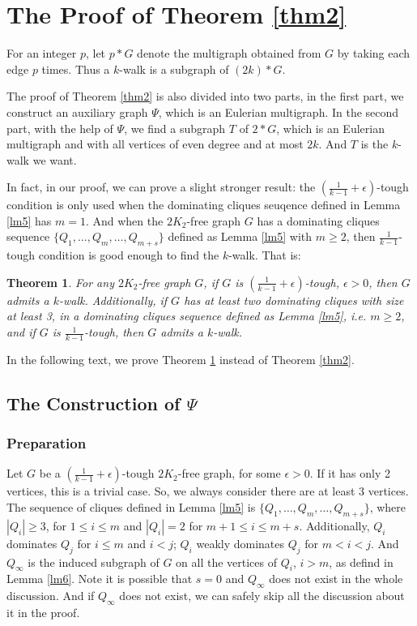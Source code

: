 \documentclass{amsart}
\newtheorem{theorem}{Theorem}
\begin{document}
\section{The Proof of Theorem \ref{thm2}}

For an integer $p$, let $p*G$ denote the multigraph obtained from $G$ by taking each edge $p$ times. 
Thus a $k$-walk is a subgraph of $(2k)*G$. 

The proof of Theorem \ref{thm2} is also divided into two parts, in the first part, we construct an auxiliary graph $\Psi$, which is an Eulerian multigraph. In the second part, with the help of $\Psi$, we find a subgraph $T$ of $2*G$, which is an Eulerian multigraph and with all vertices of even degree and at most $2k$. And $T$ is the $k$-walk we want.

In fact, in our proof, we can prove a slight stronger result: the $(\frac{1}{k-1}+\epsilon)$-tough condition is only used when the dominating cliques seuqence defined in Lemma \ref{lm5} has $m=1$. And when the $2K_2$-free graph $G$ has a dominating cliques sequence $\{Q_1,\ldots,Q_m,\ldots,Q_{m+s}\}$ defined as Lemma \ref{lm5} with $m\ge2$, then $\frac{1}{k-1}$-tough condition is good enough to find the $k$-walk. That is:
\begin{theorem}\label{opt}
For any $2K_2$-free graph $G$, if $G$ is $(\frac{1}{k-1}+\epsilon)$-tough, $\epsilon>0$, then $G$ admits a $k$-walk. Additionally, if $G$ has at least two dominating cliques with size at least 3, in a dominating cliques sequence defined as Lemma \ref{lm5}, i.e. $m\ge2$, and if $G$ is $\frac{1}{k-1}$-tough, then $G$ admits a $k$-walk.
\end{theorem}
In the following text, we prove Theorem \ref{opt} instead of Theorem \ref{thm2}.


\subsection{The Construction of $\Psi$}

\subsubsection{Preparation}

Let $G$ be a $(\frac{1}{k-1}+\epsilon)$-tough $2K_2$-free graph, for some $\epsilon>0$. If it has only 2 vertices, this is a trivial case. So, we always consider there are at least 3 vertices. The sequence of cliques defined in Lemma \ref{lm5} is $\{Q_1,\ldots,Q_m,\ldots,Q_{m+s}\}$, where $|Q_i|\ge3$, for $1\le i\le m$ and $|Q_i|=2$ for $m+1\le i\le m+s$. Additionally, $Q_i$ dominates $Q_j$ for $i\le m$ and $i<j$; $Q_i$ weakly dominates $Q_j$ for $m<i<j$. And $Q_{\infty}$ is the induced subgraph of $G$ on all the vertices of $Q_i$, $i>m$, as defind in Lemma \ref{lm6}. Note it is possible that $s=0$ and $Q_{\infty}$ does not exist in the whole discussion. And if $Q_{\infty}$ does not exist, we can safely skip all the discussion about it in the proof.
\end{document}
